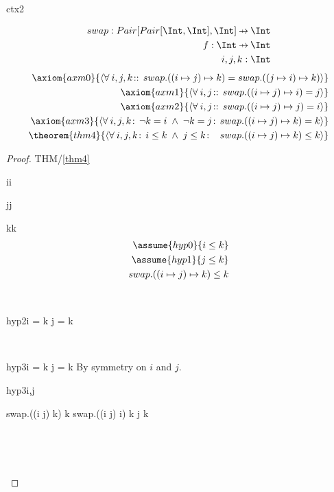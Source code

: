 \documentclass[12pt]{amsart}
\begin{document}
\begin{context}{ctx2}

\begin{align*}
\constant{swap : Pair [Pair [ \Int, \Int ], \Int ] \pfun \Int } \\
\dummy{ f : \Int \pfun \Int } \\
\dummy{ i,j,k : \Int } 
\end{align*}
\begin{align*}
\axiom{axm0}{ \qforall{i,j,k}{}{ swap.((i \mapsto j) \mapsto k) = swap.((j \mapsto i) \mapsto k) } } \\
\axiom{axm1}{ \qforall{i,j}{}{ swap.((i \mapsto j) \mapsto i) = j } } \\
\axiom{axm2}{ \qforall{i,j}{}{ swap.((i \mapsto j) \mapsto j) = i } } \\
\axiom{axm3}{ \qforall{i,j,k}{\neg k = i \1\land \neg k = j}{ swap.((i \mapsto j) \mapsto k) = k } } \\
\theorem{thm4}{ \qforall{i,j,k}{i \le k \1\land j \le k}{  ~ ~ swap.((i \mapsto j) \mapsto k) \le k } } \\
\end{align*}

\begin{proof}{THM/\ref{thm4}}
\begin{free:var}{i}{i}
\begin{free:var}{j}{j}
\begin{free:var}{k}{k}
	\begin{align}
	\assume{hyp0}{i \le k} \\
	\assume{hyp1}{j \le k} \\
	\goal{ swap.((i \mapsto j) \mapsto k) \le k }
	\end{align}
	\noindent
	\begin{by:cases} \\
	\begin{case}{hyp2}{\neg i = k \land \neg j = k}
		\easy
	\end{case} \\
	\begin{case}{hyp3}{i = k \lor j = k}
		By symmetry on $i$ and $j$.
		\begin{by:symmetry}{hyp3}{i,j}
		\begin{calculation}
			swap.((i \mapsto j) \mapsto k) \le k
		\hint{=}{ \eqref{hyp3} }
			swap.((i \mapsto j) \mapsto i) \le k
		\hint{=}{ \eqref{axm1} }
			j \le k
		\hint{=}{ \eqref{hyp0} }
			\true
		\end{calculation}
		\end{by:symmetry} \\
	\noindent \end{case} \\
	\end{by:cases}
\end{free:var}
\end{free:var}
\end{free:var}
\end{proof}

\end{context}
\end{document}
